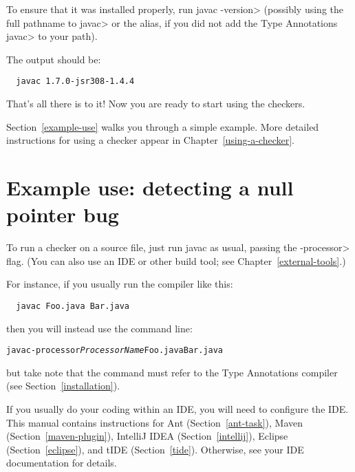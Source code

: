 To ensure that it was installed properly, run \<javac -version> (possibly using the
full pathname to \<javac> or the alias, if you did not add the Type Annotations \<javac> to your path).

The output should be:

\begin{Verbatim}
  javac 1.7.0-jsr308-1.4.4
\end{Verbatim}

That's all there is to it!  Now you are ready to start using the checkers.

Section~\ref{example-use} walks you through a simple example.  More detailed
instructions for using a checker appear in Chapter~\ref{using-a-checker}.


\section{Example use:  detecting a null pointer bug\label{example-use}}

To run a checker on a source file, just run javac as usual, passing the
\<-processor> flag.  (You can also use an IDE or other build tool; see
Chapter~\ref{external-tools}.)

For instance, if you usually run the compiler like
this:

\begin{Verbatim}
  javac Foo.java Bar.java
\end{Verbatim}

\noindent
then you will instead use the command line:

\begin{alltt}
  javac -processor \textit{ProcessorName} Foo.java Bar.java
\end{alltt}

\noindent
but take note that the  command must refer to the Type
Annotations compiler (see Section~\ref{installation}).


If you usually do your coding within an IDE, you will need to configure
the IDE.  This manual contains instructions for
Ant (Section~\ref{ant-task}),
Maven (Section~\ref{maven-plugin}),
IntelliJ IDEA (Section~\ref{intellij}),
Eclipse (Section~\ref{eclipse}), and
tIDE (Section~\ref{tide}).
Otherwise, see your IDE documentation for details.



